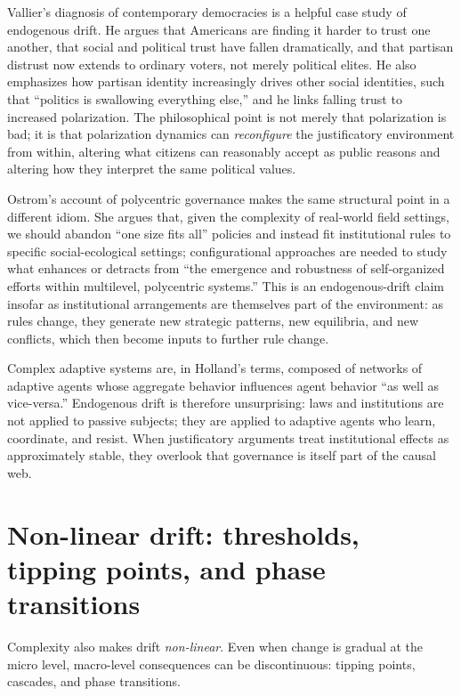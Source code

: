 \documentclass[12pt]{report}
\begin{document}
Vallier’s diagnosis of contemporary democracies is a helpful case study of endogenous drift. He argues that Americans are finding it harder to trust one another, that social and political trust have fallen dramatically, and that partisan distrust now extends to ordinary voters, not merely political elites. \parencite[p.~1]{vallier2020trust} He also emphasizes how partisan identity increasingly drives other social identities, such that “politics is swallowing everything else,” and he links falling trust to increased polarization. \parencite[p.~3]{vallier2020trust} The philosophical point is not merely that polarization is bad; it is that polarization dynamics can \emph{reconfigure} the justificatory environment from within, altering what citizens can reasonably accept as public reasons and altering how they interpret the same political values.

Ostrom’s account of polycentric governance makes the same structural point in a different idiom. She argues that, given the complexity of real-world field settings, we should abandon “one size fits all” policies and instead fit institutional rules to specific social-ecological settings; configurational approaches are needed to study what enhances or detracts from “the emergence and robustness of self-organized efforts within multilevel, polycentric systems.” \parencite[p.~642]{ostrom2010polycentric} This is an endogenous-drift claim insofar as institutional arrangements are themselves part of the environment: as rules change, they generate new strategic patterns, new equilibria, and new conflicts, which then become inputs to further rule change.

Complex adaptive systems are, in Holland’s terms, composed of networks of adaptive agents whose aggregate behavior influences agent behavior “as well as vice-versa.” \parencite[p.~2]{holland2012signals} Endogenous drift is therefore unsurprising: laws and institutions are not applied to passive subjects; they are applied to adaptive agents who learn, coordinate, and resist. When justificatory arguments treat institutional effects as approximately stable, they overlook that governance is itself part of the causal web.

\section{Non-linear drift: thresholds, tipping points, and phase transitions}

Complexity also makes drift \emph{non-linear}. Even when change is gradual at the micro level, macro-level consequences can be discontinuous: tipping points, cascades, and phase transitions.
\end{document}
